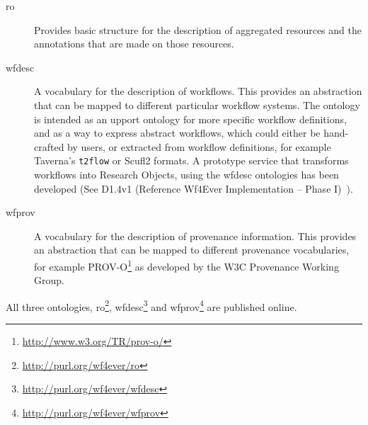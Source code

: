 \begin{description}
\item[ro] Provides basic structure for the description of aggregated
  resources and the annotations that are made on those resources.
\item[wfdesc] A vocabulary for the description of workflows. This
  provides an abstraction that can be mapped to different particular
  workflow systems. The ontology is intended as an upport ontology for more specific workflow definitions, and as a way to express abstract workflows, which could either be hand-crafted by users, or extracted from workflow definitions, for example Taverna's \texttt{t2flow} or Scufl2 formats. A prototype service that transforms workflows into Research Objects, using the wfdesc ontologies has been developed (See D1.4v1 (Reference Wf4Ever Implementation -- Phase I)~\cite{D1.4v1}). 
\item[wfprov] A vocabulary for the description of provenance
  information. This provides an abstraction that can be mapped to
  different provenance vocabularies, for example PROV-O\footnote{\url{http://www.w3.org/TR/prov-o/}} as developed by the W3C Provenance Working Group.
\end{description}

All three ontologies, ro\footnote{\url{http://purl.org/wf4ever/ro}}, wfdesc\footnote{\url{http://purl.org/wf4ever/wfdesc}} and wfprov\footnote{\url{http://purl.org/wf4ever/wfprov}} are published online. 




